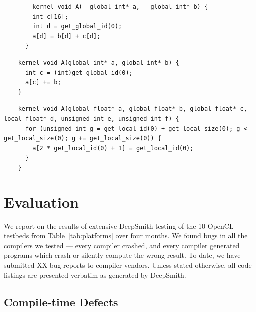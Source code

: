 \newsavebox{\UninitRead}
\begin{lrbox}{\UninitRead}
  \hspace{1.5em}
  \begin{lstlisting}
      __kernel void A(__global int* a, __global int* b) {
        int c[16];
        int d = get_global_id(0);
        a[d] = b[d] + c[d];
      }
  \end{lstlisting}
\end{lrbox}

\newsavebox{\IntelPtrAssertion}
\begin{lrbox}{\IntelPtrAssertion}
  \hspace{1.5em}
  \begin{lstlisting}
    kernel void A(global int* a, global int* b) {
      int c = (int)get_global_id(0);
      a[c] += b;
    }
  \end{lstlisting}
\end{lrbox}

\newsavebox{\IntelScalarAssertion}
\begin{lrbox}{\IntelScalarAssertion}
  \hspace{1.5em}
  \begin{lstlisting}
    kernel void A(global float* a, global float* b, global float* c, local float* d, unsigned int e, unsigned int f) {
      for (unsigned int g = get_local_id(0) + get_local_size(0); g < get_local_size(0); g += get_local_size(0)) {
        a[2 * get_local_id(0) + 1] = get_local_id(0);
      }
    }
  \end{lstlisting}
\end{lrbox}



\section{Evaluation}%
\label{sec:eval}

We report on the results of extensive DeepSmith testing of the 10 OpenCL testbeds from Table~\ref{tab:platforms} over four months. We found bugs in all the compilers we tested --- every compiler crashed, and every compiler generated programs which crash or silently compute the wrong result. To date, we have submitted XX bug reports to compiler vendors. %
Unless stated otherwise, all code listings are presented verbatim as generated by DeepSmith.


\subsection{Compile-time Defects}%
\label{subsec:compile-time-defects}

